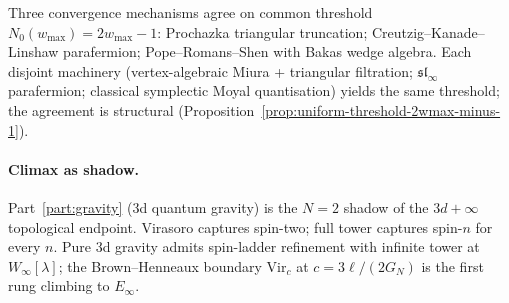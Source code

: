 Three convergence mechanisms agree on common threshold
$N_0(w_{\max}) = 2w_{\max} - 1$: Prochazka triangular truncation;
Creutzig--Kanade--Linshaw parafermion; Pope--Romans--Shen with
Bakas wedge algebra. Each disjoint machinery
(vertex-algebraic Miura + triangular filtration;
$\mathfrak{sl}_\infty$ parafermion; classical symplectic Moyal
quantisation) yields the same threshold; the agreement is
structural
(Proposition~\ref{prop:uniform-threshold-2wmax-minus-1}).

\paragraph{Climax as shadow.}
Part~\ref{part:gravity} (3d quantum gravity) is the $N = 2$
shadow of the $3d{+}\infty$ topological endpoint. Virasoro
captures spin-two; full tower captures spin-$n$ for every $n$.
Pure 3d gravity admits spin-ladder refinement with infinite
tower at $W_\infty[\lambda]$; the Brown--Henneaux boundary
$\mathrm{Vir}_c$ at $c = 3\ell/(2G_N)$ is the first rung climbing
to $E_\infty$.

